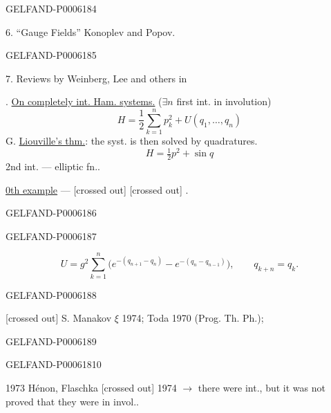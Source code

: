 \begin{GelfandAdjacentEvidence}{GELFAND-P000618}{4}

6. “Gauge Fields” Konoplev and Popov.
\end{GelfandAdjacentEvidence}
\begin{GelfandAdjacentEvidence}{GELFAND-P000618}{5}


7. Reviews by Weinberg, Lee and others in

. \underline{On completely int. Ham. systems.}
(\(\exists n\) first int. in involution)
\[
H=\frac12\sum_{k=1}^n p_k^2+U(q_1,\ldots,q_n)
\]
G. \underline{Liouville’s thm.}: the syst. is then solved by quadratures.
\[
H=\tfrac12p^2+\sin q
\]
2nd int. — elliptic fn..

\underline{0th example} — [crossed out] 
[crossed out] .
\end{GelfandAdjacentEvidence}
\begin{GelfandAdjacentEvidence}{GELFAND-P000618}{6}

\end{GelfandAdjacentEvidence}
\begin{GelfandAdjacentEvidence}{GELFAND-P000618}{7}

\[
U=g^2\sum_{k=1}^{n}\bigl(e^{-(q_{n+1}-q_n)}-e^{-(q_n-q_{n-1})}\bigr),
\qquad q_{k+n}=q_k.
\]
\end{GelfandAdjacentEvidence}
\begin{GelfandAdjacentEvidence}{GELFAND-P000618}{8}


[crossed out] S. Manakov \(\xi\) 1974; Toda 1970 (Prog. Th. Ph.);
\end{GelfandAdjacentEvidence}
\begin{GelfandAdjacentEvidence}{GELFAND-P000618}{9}

\end{GelfandAdjacentEvidence}
\begin{GelfandAdjacentEvidence}{GELFAND-P000618}{10}


1973 Hénon, Flaschka [crossed out] 1974
\(\longrightarrow\) there were int., but it was not proved that they were in invol..
\end{GelfandAdjacentEvidence}
